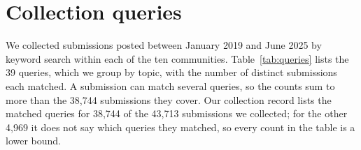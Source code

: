 \appendix

\section{Collection queries}
\label{app:queries}

We collected submissions posted between January 2019 and June 2025 by keyword
search within each of the ten communities. Table~\ref{tab:queries} lists the 39
queries, which we group by topic, with the number of distinct submissions each
matched. A submission can match several queries, so the counts sum to more than
the 38,744 submissions they cover. Our collection record lists the matched
queries for 38,744 of the 43,713 submissions we collected; for the other 4,969 it does not say which queries they matched, so every count in the table is a lower bound.

